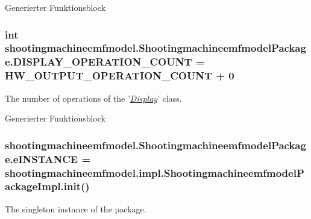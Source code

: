 Generierter Funktionsblock  \hypertarget{interfaceshootingmachineemfmodel_1_1_shootingmachineemfmodel_package_a1b4ff159ceee549b0563fa4a343b65c2}{
\subsubsection[{D\-I\-S\-P\-L\-A\-Y\-\_\-\-O\-P\-E\-R\-A\-T\-I\-O\-N\-\_\-\-C\-O\-U\-N\-T}]{\setlength{\rightskip}{0pt plus 5cm}int shootingmachineemfmodel.\-Shootingmachineemfmodel\-Package.\-D\-I\-S\-P\-L\-A\-Y\-\_\-\-O\-P\-E\-R\-A\-T\-I\-O\-N\-\_\-\-C\-O\-U\-N\-T = {\bf H\-W\-\_\-\-O\-U\-T\-P\-U\-T\-\_\-\-O\-P\-E\-R\-A\-T\-I\-O\-N\-\_\-\-C\-O\-U\-N\-T} + 0}}\label{interfaceshootingmachineemfmodel_1_1_shootingmachineemfmodel_package_a1b4ff159ceee549b0563fa4a343b65c2}
The number of operations of the '{\itshape \hyperlink{interfaceshootingmachineemfmodel_1_1_display}{Display}}' class.

Generierter Funktionsblock  \hypertarget{interfaceshootingmachineemfmodel_1_1_shootingmachineemfmodel_package_a1a262932821c602a7ee1e9cbb214c625}{
\subsubsection[{e\-I\-N\-S\-T\-A\-N\-C\-E}]{ shootingmachineemfmodel.\-Shootingmachineemfmodel\-Package.\-e\-I\-N\-S\-T\-A\-N\-C\-E = {\bf shootingmachineemfmodel.\-impl.\-Shootingmachineemfmodel\-Package\-Impl.\-init}()}}\label{interfaceshootingmachineemfmodel_1_1_shootingmachineemfmodel_package_a1a262932821c602a7ee1e9cbb214c625}
The singleton instance of the package.

